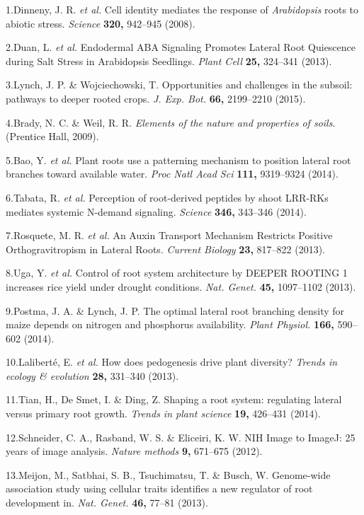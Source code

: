 \documentclass[]{article}
\begin{document}
1.Dinneny, J. R. \emph{et al.} Cell identity mediates the response of
\emph{Arabidopsis} roots to abiotic stress. \emph{Science} \textbf{320,}
942--945 (2008).

2.Duan, L. \emph{et al.} Endodermal ABA Signaling Promotes Lateral Root
Quiescence during Salt Stress in Arabidopsis Seedlings. \emph{Plant
Cell} \textbf{25,} 324--341 (2013).

3.Lynch, J. P. \& Wojciechowski, T. Opportunities and challenges in the
subsoil: pathways to deeper rooted crops. \emph{J. Exp. Bot.}
\textbf{66,} 2199--2210 (2015).

4.Brady, N. C. \& Weil, R. R. \emph{Elements of the nature and
properties of soils}. (Prentice Hall, 2009).

5.Bao, Y. \emph{et al.} Plant roots use a patterning mechanism to
position lateral root branches toward available water. \emph{Proc Natl
Acad Sci} \textbf{111,} 9319--9324 (2014).

6.Tabata, R. \emph{et al.} Perception of root-derived peptides by shoot
LRR-RKs mediates systemic N-demand signaling. \emph{Science}
\textbf{346,} 343--346 (2014).

7.Rosquete, M. R. \emph{et al.} An Auxin Transport Mechanism Restricts
Positive Orthogravitropism in Lateral Roots. \emph{Current Biology}
\textbf{23,} 817--822 (2013).

8.Uga, Y. \emph{et al.} Control of root system architecture by DEEPER
ROOTING 1 increases rice yield under drought conditions. \emph{Nat.
Genet.} \textbf{45,} 1097--1102 (2013).

9.Postma, J. A. \& Lynch, J. P. The optimal lateral root branching
density for maize depends on nitrogen and phosphorus availability.
\emph{Plant Physiol.} \textbf{166,} 590--602 (2014).

10.Lalibert{é}, E. \emph{et al.} How does pedogenesis drive plant
diversity? \emph{Trends in ecology \& evolution} \textbf{28,} 331--340
(2013).

11.Tian, H., De Smet, I. \& Ding, Z. Shaping a root system: regulating
lateral versus primary root growth. \emph{Trends in plant science}
\textbf{19,} 426--431 (2014).

12.Schneider, C. A., Rasband, W. S. \& Eliceiri, K. W. NIH Image to
ImageJ: 25 years of image analysis. \emph{Nature methods} \textbf{9,}
671--675 (2012).

13.Meijon, M., Satbhai, S. B., Tsuchimatsu, T. \& Busch, W. Genome-wide
association study using cellular traits identifies a new regulator of
root development in. \emph{Nat. Genet.} \textbf{46,} 77--81 (2013).
\end{document}
